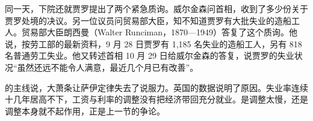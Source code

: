 同一天，下院还就贾罗提出了两个紧急质询。威尔金森问首相，收到了多少份关于贾罗处境的决议\cite{hansard1936}。另一位议员问贸易部大臣，知不知道贾罗有大批失业的造船工人\cite{hansard1936}。贸易部大臣朗西曼（Walter Runciman，1870—1949）答复了这个质询\cite{hansard1936,hansardpeople32}。他说，按劳工部的最新资料，9 月 28 日贾罗有 1,185 名失业的造船工人，另有 818 名普通劳工失业\cite{hansard1936}。他又转述首相 10 月 29 日给威尔金森的答复，说贾罗的失业状况“虽然还远不能令人满意，最近几个月已有改善”\cite{hansard1936}。

的主线说，大萧条让萨伊定律失去了说服力。英国的数据说明了原因。失业率连续十几年居高不下，工资与利率的调整没有把经济带回充分就业。是调整太慢，还是调整本身就不起作用，正是上一节的争论。


